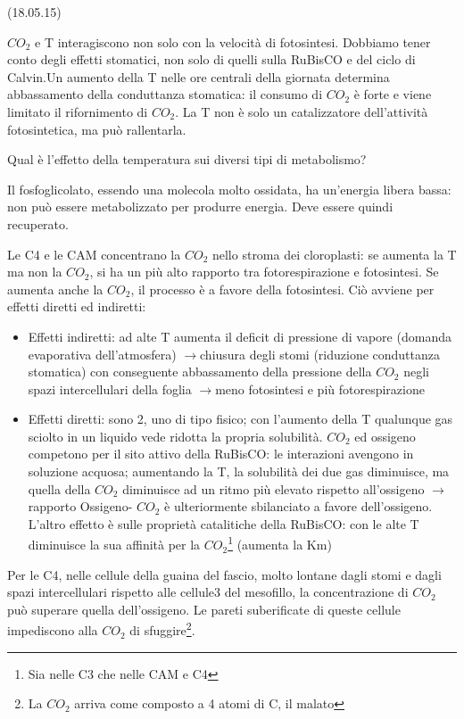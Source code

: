 \documentclass[a4paper,12pt]{book}
\newcommand{\lfreccia}{\ensuremath{\longrightarrow}}
\begin{document}
(18.05.15) 

 $CO_{2}$ e T interagiscono non solo con la velocità di fotosintesi. Dobbiamo tener conto degli effetti stomatici, non solo di quelli sulla RuBisCO e del ciclo di Calvin.Un aumento della T nelle ore centrali della giornata determina abbassamento della conduttanza stomatica: il consumo di  $CO_{2}$ è forte e viene limitato il rifornimento di  $CO_{2}$. La T non è solo un catalizzatore dell'attività fotosintetica, ma può rallentarla.

Qual è l'effetto della temperatura sui diversi tipi di metabolismo?

Il fosfoglicolato, essendo una molecola molto ossidata, ha un'energia libera bassa: non può essere metabolizzato per produrre energia. Deve essere quindi recuperato.

Le C4 e le CAM concentrano la  $CO_{2}$ nello stroma dei cloroplasti:  se aumenta la T ma non la  $CO_{2}$, si ha un più alto rapporto tra fotorespirazione e fotosintesi. Se aumenta anche la  $CO_{2}$, il processo è a favore della fotosintesi. Ciò avviene per effetti diretti ed indiretti:
\begin{itemize}
\item{Effetti indiretti: ad alte T aumenta il deficit di pressione di vapore (domanda evaporativa dell'atmosfera) \lfreccia chiusura degli stomi (riduzione conduttanza stomatica) con conseguente abbassamento della pressione della  $CO_{2}$ negli spazi intercellulari della foglia \lfreccia meno fotosintesi e più fotorespirazione}    
\item{Effetti diretti: sono 2, uno di tipo fisico; con l'aumento della T qualunque gas sciolto in un liquido vede ridotta la propria solubilità.  $CO_{2}$ ed ossigeno competono per il sito attivo della RuBisCO: le interazioni avengono in soluzione acquosa; aumentando la T, la solubilità dei due gas diminuisce, ma quella della  $CO_{2}$ diminuisce ad un ritmo più elevato rispetto all'ossigeno \lfreccia rapporto Ossigeno- $CO_{2}$ è ulteriormente sbilanciato a favore dell'ossigeno. L'altro effetto è sulle proprietà catalitiche della RuBisCO: con le alte T diminuisce la sua affinità per la  $CO_{2}$\footnote{Sia nelle C3 che nelle CAM e C4} (aumenta la Km)}
\end{itemize}
 
Per le C4, nelle cellule della guaina del fascio, molto lontane dagli stomi e dagli spazi intercellulari rispetto alle cellule3 del mesofillo, la concentrazione di  $CO_{2}$ può superare quella dell'ossigeno.  Le pareti suberificate di queste cellule impediscono alla  $CO_{2}$ di sfuggire\footnote{La  $CO_{2}$ arriva come composto a 4 atomi di C, il malato}.
\end{document}
